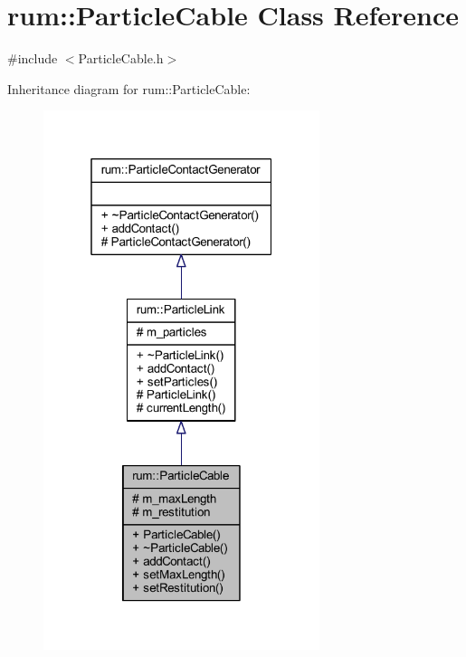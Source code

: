\hypertarget{classrum_1_1_particle_cable}{}\section{rum\+:\+:Particle\+Cable Class Reference}
\label{classrum_1_1_particle_cable}


{\ttfamily \#include $<$Particle\+Cable.\+h$>$}



Inheritance diagram for rum\+:\+:Particle\+Cable\+:\nopagebreak
\begin{figure}[H]
\begin{center}
\leavevmode
\includegraphics[width=229pt]{classrum_1_1_particle_cable__inherit__graph}
\end{center}
\end{figure}


